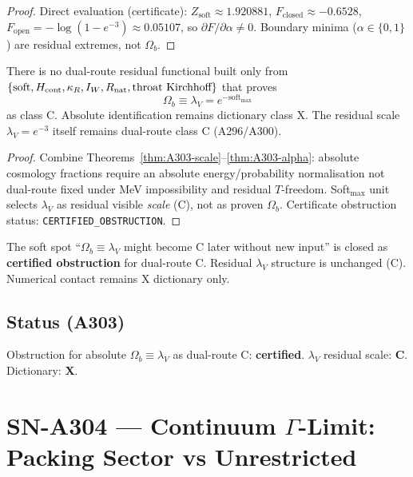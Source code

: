 \begin{proof}
Direct evaluation (certificate): $Z_{\mathrm{soft}}\approx 1.920881$, $F_{\mathrm{closed}}\approx -0.6528$,
$F_{\mathrm{open}}=-\log(1-e^{-3})\approx 0.05107$, so $\partial F/\partial\alpha\neq 0$.
Boundary minima ($\alpha\in\{0,1\}$) are residual extremes, not $\Omega_b$.
\end{proof}

\begin{theorem}
\label{thm:A303-obs}
There is no dual-route residual functional built only from
$\{\mathrm{soft},H_{\rm cont},\kappa_R,I_W,R_{\rm nat},\text{throat Kirchhoff}\}$
that proves
\begin{equation}
\Omega_b \equiv \lambda_V = e^{-\mathrm{soft}_{\max}}
\end{equation}
as class C. Absolute identification remains dictionary class X.
The residual scale $\lambda_V=e^{-3}$ itself remains dual-route class C (A296/A300).
\end{theorem}

\begin{proof}
Combine Theorems~\ref{thm:A303-scale}--\ref{thm:A303-alpha}: absolute cosmology fractions require an absolute energy/probability normalisation not dual-route fixed under MeV impossibility and residual $T$-freedom.
Soft$_{\max}$ unit selects $\lambda_V$ as residual visible \emph{scale} (C), not as proven $\Omega_b$.
Certificate obstruction status: \texttt{CERTIFIED\_OBSTRUCTION}.
\end{proof}

\begin{remark}
The soft spot ``$\Omega_b\equiv\lambda_V$ might become C later without new input'' is closed as
\textbf{certified obstruction} for dual-route C. Residual $\lambda_V$ structure is unchanged (C).
Numerical contact remains X dictionary only.
\end{remark}

\subsection*{Status (A303)}
Obstruction for absolute $\Omega_b\equiv\lambda_V$ as dual-route C: \textbf{certified}.
$\lambda_V$ residual scale: \textbf{C}. Dictionary: \textbf{X}.

\section{SN-A304 --- Continuum $\Gamma$-Limit: Packing Sector vs Unrestricted}
\label{sec:SN-A304}

